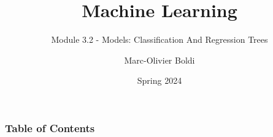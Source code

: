 
\title{Machine Learning}
\subtitle{Module 3.2 - Models: Classification And Regression Trees}
\author[MOB]{Marc-Olivier Boldi}
\date[Spring 2024]{Spring 2024}

\begin{frame}
  \titlepage
\end{frame}
\begin{frame}
\frametitle{Table of Contents}
	\tableofcontents
\end{frame}
